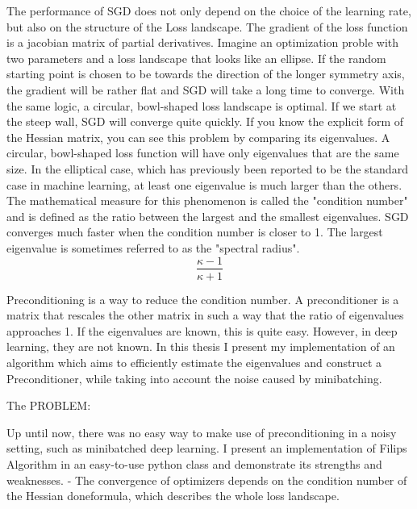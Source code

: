 \documentclass[twoside,12pt,a4paper]{report}
\begin{document}
The performance of SGD does not only depend on the choice of the learning rate, but also on the structure of the Loss landscape. The gradient of the loss function is a jacobian matrix of partial derivatives. Imagine an optimization proble with two parameters and a loss landscape that looks like an ellipse. If the random starting point is chosen to be towards the direction of the longer symmetry axis, the gradient will be rather flat and SGD will take a long time to converge. With the same logic, a circular, bowl-shaped loss landscape is optimal.
If we start at the steep wall, SGD will converge quite quickly. If you know the explicit form of the Hessian matrix, you can see this problem by comparing its eigenvalues. A circular, bowl-shaped loss function will have only eigenvalues that are the same size. In the elliptical case, which has previously been reported to be the standard case in machine learning, at least one eigenvalue is much larger than the others.
The mathematical measure for this phenomenon is called the "condition number" and is defined as the ratio between the largest and the smallest eigenvalues. SGD converges much faster when the condition number is closer to 1. The largest eigenvalue is sometimes referred to as the "spectral radius".
$$ \frac{\kappa - 1}{\kappa + 1}$$

Preconditioning is a way to reduce the condition number. A preconditioner is a matrix that rescales the other matrix in such a way that the ratio of eigenvalues approaches 1.
If the eigenvalues are known, this is quite easy. However, in deep learning, they are not known. In this thesis I present my implementation of an algorithm which aims to efficiently estimate the eigenvalues and construct a Preconditioner, while taking into account the noise caused by minibatching.


The PROBLEM:

Up until now, there was no easy way to make use of preconditioning in a noisy setting, such as minibatched deep learning. I present an implementation of Filips Algorithm in an easy-to-use python class and demonstrate its strengths and weaknesses.
- The convergence of optimizers depends on the condition number of the Hessian done{formula}, which describes the whole loss landscape.
\end{document}
